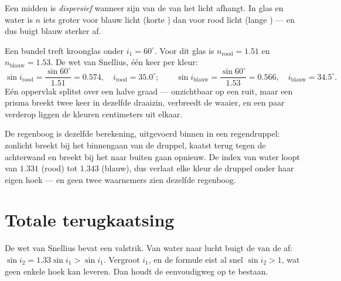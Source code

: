\begin{definition}[Dispersie]\label{def:g10:refraction:dispersion}
Een midden is \emph{dispersief} wanneer zijn
 van de  van het licht afhangt. In glas en water
is $n$ iets groter voor blauw licht (korte ) dan voor rood
licht (lange ) --- en dus buigt blauw sterker af.
\end{definition}

\begin{example}\label{ex:g10:refraction:twocolors}
Een bundel  treft kroonglas onder $i_1 = 60^\circ$. Voor dit
glas is $n_{\text{rood}} = 1.51$ en $n_{\text{blauw}} = 1.53$. De wet van
Snellius, één keer per kleur:
\[
\sin i_{\text{rood}} = \frac{\sin 60^\circ}{1.51} = 0.574,
\quad i_{\text{rood}} = 35.0^\circ ;
\qquad
\sin i_{\text{blauw}} = \frac{\sin 60^\circ}{1.53} = 0.566,
\quad i_{\text{blauw}} = 34.5^\circ .
\]
Eén oppervlak splitst  over een halve graad --- onzichtbaar op
een ruit, maar een prisma breekt twee keer in dezelfde draaizin,
verbreedt de waaier, en een paar  verderop liggen de kleuren
centimeters uit elkaar.
\end{example}

\begin{remark}\label{rem:g10:refraction:rainbow}
De regenboog is dezelfde berekening, uitgevoerd binnen in een
regendruppel: zonlicht breekt bij het binnengaan van de druppel, kaatst
terug tegen de achterwand en breekt bij het naar buiten gaan opnieuw. De
index van water loopt van $1.331$ (rood) tot $1.343$ (blauw), dus verlaat
elke kleur de druppel onder haar eigen hoek --- en geen twee waarnemers
zien dezelfde regenboog.
\end{remark}

\section{Totale terugkaatsing}

De wet van Snellius bevat een valstrik. Van water naar lucht buigt de
 van de  af: $\sin i_2 = 1.33 \sin i_1 > \sin i_1$.
Vergroot $i_1$, en de formule eist al snel $\sin i_2 > 1$, wat geen
enkele hoek kan leveren. Dan houdt de  eenvoudigweg op te bestaan.

